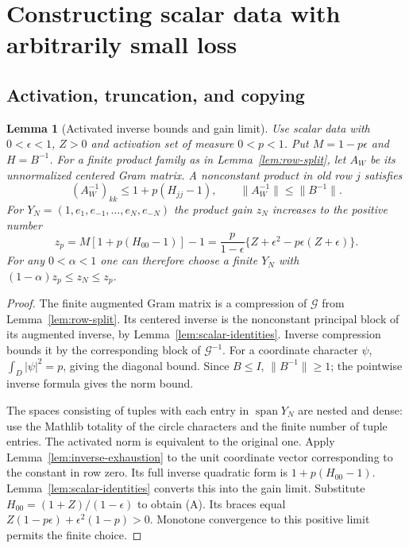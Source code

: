 \documentclass[reqno,a4paper,12pt]{amsart}
\newtheorem{lemma}[theorem]{Lemma}
\theoremstyle{definition}
\newcommand{\spn}{\operatorname{span}}
\begin{document}
\section{Constructing scalar data with arbitrarily small loss}
\subsection{Activation, truncation, and copying}
\begin{lemma}[Activated inverse bounds and gain limit]\label{lem:rare-data}
Use scalar data with $0<\epsilon<1$, $Z>0$ and activation set of
measure $0<p<1$. Put $M=1-p\epsilon$ and $H=B^{-1}$.
For a finite product family as in Lemma~\ref{lem:row-split}, let
$A_W$ be its unnormalized centered Gram matrix. A nonconstant product
in old row $j$ satisfies
\[
 (A_W^{-1})_{kk}\le1+p(H_{jj}-1),\qquad
 \|A_W^{-1}\|\le\|B^{-1}\|.
\]
For $Y_N=(1,e_1,e_{-1},\ldots,e_N,e_{-N})$ the product gain $z_N$
increases to the positive number
\[
 z_p=M[1+p(H_{00}-1)]-1
 =\frac p{1-\epsilon}
   \{Z+\epsilon^2-p\epsilon(Z+\epsilon)\}.
 \tag{A}\label{eq:rare-gain}
\]
For any $0<\alpha<1$ one can therefore choose a finite $Y_N$ with
$(1-\alpha)z_p\le z_N\le z_p$.
\end{lemma}
\begin{proof}
The finite augmented Gram matrix is a compression of $\mathcal G$
from Lemma~\ref{lem:row-split}. Its centered inverse is the
nonconstant principal block of its augmented inverse, by
Lemma~\ref{lem:scalar-identities}. Inverse compression bounds it by
the corresponding block of $\mathcal G^{-1}$.
For a coordinate character $\psi$, $\int_D|\psi|^2=p$, giving the
diagonal bound. Since $B\le I$, $\|B^{-1}\|\ge1$; the pointwise
inverse formula gives the norm bound.

The spaces consisting of tuples with each entry in $\spn Y_N$ are
nested and dense: use the Mathlib totality of the circle characters
and the finite number of tuple entries. The activated norm is
equivalent to the original one. Apply Lemma~\ref{lem:inverse-exhaustion}
to the unit coordinate vector corresponding to the constant in row
zero. Its full inverse quadratic form is $1+p(H_{00}-1)$.
Lemma~\ref{lem:scalar-identities} converts this into the gain limit.
Substitute $H_{00}=(1+Z)/(1-\epsilon)$ to obtain (A).
Its braces equal $Z(1-p\epsilon)+\epsilon^2(1-p)>0$.
Monotone convergence to this positive limit permits the finite choice.
\end{proof}
\end{document}
